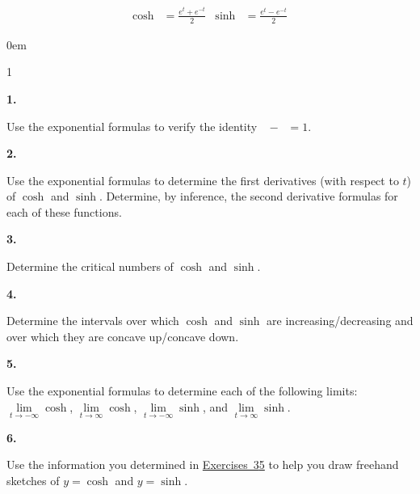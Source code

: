\documentclass[12pt,]{book}
\theoremstyle{plain}
\theoremstyle{definition}
\numberwithin{equation}{section}
\newenvironment{exercisegroup}%
{\medskip\noindent}%
{\par\bigskip}%
\newlength{\exercisegroupindent}%
\newlength{\exercisegroupitemwidth}%
\newenvironment{exercisegrouplist}%
{\vspace{-\partopsep}%
\begin{adjustwidth}{\exercisegroupindent}{0em}}%
{\end{adjustwidth}%
\vspace{-\partopsep}%
\vspace{\baselineskip}}%
\newenvironment{exercisegroupbycol}[1]%
{\begin{exercisegrouplist}%
\vspace{-\multicolsep}%
\begin{multicols}{#1}%
\setlength{\parindent}{0em}%
\setlength{\exercisegroupitemwidth}{\linewidth}}%
{\end{multicols}%
\vspace{-\multicolsep}%
\end{exercisegrouplist}}%
\newenvironment{exercisegroupitem}[1]%
{\begin{minipage}[t]{\exercisegroupitemwidth}
\vspace{0pt}%
{\bfseries#1}%
\rule{0pt}{\baselineskip}}{\strut%
\end{minipage}%
\hspace{\columnsep}}%
\providecommand\phantomsection{}
\newcommand{\fe}[2]{\mathop{{#1}{\left(#2\right)}}}
\begin{document}
\begin{exercisegroup}
\begin{align*}
\fe{\cosh}{t}&=\frac{e^{t}+e^{-t}}{2}&\fe{\sinh}{t}&=\frac{e^{t}-e^{-t}}{2}
\end{align*}%
\par
\begin{exercisegroupbycol}{1}%
\begin{exercisegroupitem}{1. }\phantomsection\hypertarget{exercise-70}{\null}
Use the exponential formulas to verify the identity \(\fe{\cosh^2}{t}-\fe{\sinh^2}{t}=1\).%
\end{exercisegroupitem}%
\par%
\begin{exercisegroupitem}{2. }\phantomsection\hypertarget{exercise-71}{\null}
Use the exponential formulas to determine the first derivatives (with respect to \(t\)) of \(\fe{\cosh}{t}\) and \(\fe{\sinh}{t}\).  Determine, by inference, the second derivative formulas for each of these functions.%
\end{exercisegroupitem}%
\par%
\begin{exercisegroupitem}{3. }\phantomsection\hypertarget{exercise-critical-hyperbolic}{\null}
Determine the critical numbers of \(\cosh\) and \(\sinh\).%
\end{exercisegroupitem}%
\par%
\begin{exercisegroupitem}{4. }\phantomsection\hypertarget{exercise-73}{\null}
Determine the intervals over which \(\cosh\) and \(\sinh\) are increasing/decreasing and over which they are concave up/concave down.%
\end{exercisegroupitem}%
\par%
\begin{exercisegroupitem}{5. }\phantomsection\hypertarget{exercise-hyperbolic-limits}{\null}
Use the exponential formulas to determine each of the following limits: \(\lim\limits_{t\to-\infty}\fe{\cosh}{t}\), \(\lim\limits_{t\to\infty}\fe{\cosh}{t}\), \(\lim\limits_{t\to-\infty}\fe{\sinh}{t}\), and \(\lim\limits_{t\to\infty}\fe{\sinh}{t}\).%
\end{exercisegroupitem}%
\par%
\begin{exercisegroupitem}{6. }\phantomsection\hypertarget{exercise-75}{\null}
Use the information you determined in \hyperref[exercise-critical-hyperbolic]{Exercises~3}\textendash{}\hyperref[exercise-hyperbolic-limits]{5} to help you draw freehand sketches of \(y=\fe{\cosh}{t}\) and \(y=\fe{\sinh}{t}\).%
\end{exercisegroupitem}%
\par%

\end{exercisegroupbycol}
\end{exercisegroup}
\end{document}
